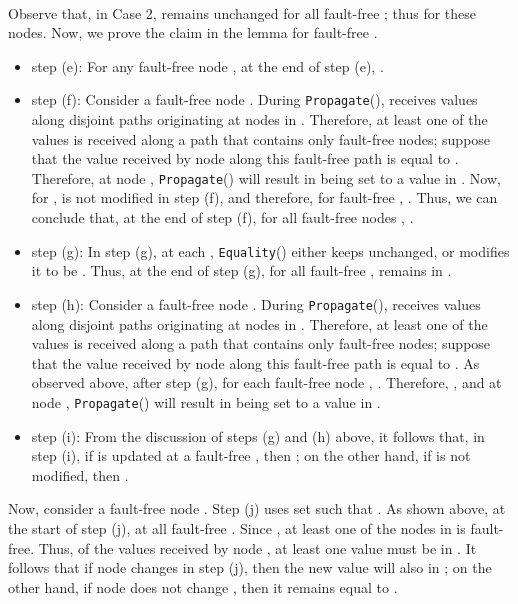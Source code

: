 \documentclass[letterpaper, 11pt]{article}
\newenvironment{proof}{\noindent {\bf Proof:}~}{\hspace*{\fill}}
\newcommand{\Propagate}{{\tt Propagate}}
\newcommand{\Equality}{{\tt Equality}}
\begin{document}
\begin{proof}
\begin{itemize}
Observe that, in Case 2,  remains unchanged for all
fault-free ; thus 
for these nodes. Now, we prove the claim in the lemma for 
fault-free .

\begin{itemize}

\item step (e):
For any fault-free node ,
at the end of step (e), .

\item
step (f):
Consider a fault-free node . During \Propagate(),
 receives  values along  disjoint paths originating
at nodes in . Therefore, at least one of the  values
is received along a path that contains only fault-free nodes;
suppose that the value received by node  along this fault-free path
is equal to .
Therefore, at node , \Propagate() will result in
 being set to a value in . Now, for ,  is not modified in step (f), and therefore,
for fault-free , . Thus, we can conclude that, at the end of step (f), for all
fault-free nodes
, .

\item
step (g):
In step (g), at each , \Equality() either keeps  unchanged,
or modifies it to be . Thus, at the end of step (g), for
all fault-free ,  remains in .

\item
step (h):
Consider a fault-free node . During \Propagate(),
 receives  values along  disjoint paths originating
at nodes in . Therefore, at least one of the  values
is received along a path that contains only fault-free nodes;
suppose that the value received by node  along this fault-free path
is equal to . As observed above, after step (g),
for each fault-free node , .
Therefore, , and at node ,
\Propagate() will result in
 being set to a value in .

\item step (i):
From the discussion of steps (g) and (h) above,
it follows that, in step (i), if  is updated
at a fault-free , then ;
on the other hand, if  is not modified,
then .
\end{itemize}
\end{itemize}
Now, consider a fault-free node . Step (j) uses set
 such that . As shown above, at the start of step (j),  at all fault-free . Since , at least one of the nodes in  is fault-free. Thus, of the  values received by node , at least one value must be in . It follows that if node  changes  in step (j), then the new value will also in ; on the other hand, if node  does not change , then it remains equal to .
\end{proof}
\end{document}
